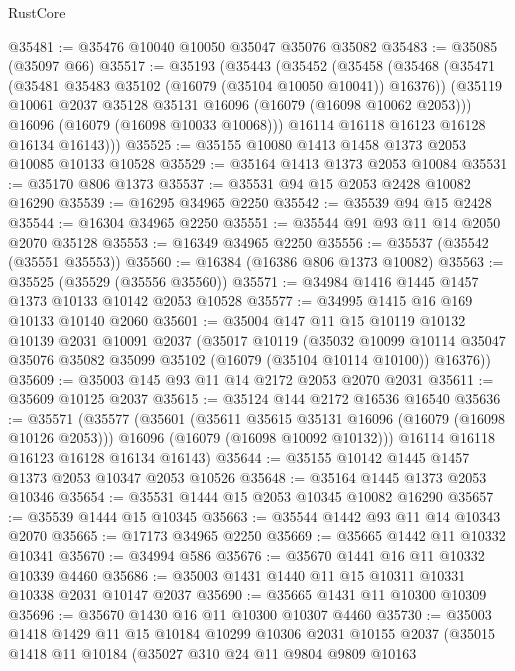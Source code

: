 \begin{lexlean}{RustCore}
\begin{coremodule}
@35481 := @35476 @10040 @10050 @35047 @35076 @35082
@35483 := @35085 (@35097 @66)
@35517 := @35193
    (@35443
      (@35452
        (@35458
          (@35468
            (@35471 (@35481 @35483 @35102 (@16079 (@35104 @10050 @10041)) @16376))
            (@35119 @10061 @2037 @35128 @35131 @16096 (@16079 (@16098 @10062 @2053)))
            @16096
            (@16079 (@16098 @10033 @10068)))
          @16114
          @16118
          @16123
          @16128
          @16134
          @16143)))
@35525 := @35155 @10080 @1413 @1458 @1373 @2053 @10085 @10133 @10528
@35529 := @35164 @1413 @1373 @2053 @10084
@35531 := @35170 @806 @1373
@35537 := @35531 @94 @15 @2053 @2428 @10082 @16290
@35539 := @16295 @34965 @2250
@35542 := @35539 @94 @15 @2428
@35544 := @16304 @34965 @2250
@35551 := @35544 @91 @93 @11 @14 @2050 @2070 @35128
@35553 := @16349 @34965 @2250
@35556 := @35537 (@35542 (@35551 @35553))
@35560 := @16384 (@16386 @806 @1373 @10082)
@35563 := @35525 (@35529 (@35556 @35560))
@35571 := @34984 @1416 @1445 @1457 @1373 @10133 @10142 @2053 @10528
@35577 := @34995 @1415 @16 @169 @10133 @10140 @2060
@35601 := @35004
    @147
    @11
    @15
    @10119
    @10132
    @10139
    @2031
    @10091
    @2037
    (@35017
      @10119
      (@35032
        @10099
        @10114
        @35047
        @35076
        @35082
        @35099
        @35102
        (@16079 (@35104 @10114 @10100))
        @16376))
@35609 := @35003 @145 @93 @11 @14 @2172 @2053 @2070 @2031
@35611 := @35609 @10125 @2037
@35615 := @35124 @144 @2172 @16536 @16540
@35636 := @35571
    (@35577
      (@35601
        (@35611 @35615 @35131 @16096 (@16079 (@16098 @10126 @2053)))
        @16096
        (@16079 (@16098 @10092 @10132)))
      @16114
      @16118
      @16123
      @16128
      @16134
      @16143)
@35644 := @35155 @10142 @1445 @1457 @1373 @2053 @10347 @2053 @10526
@35648 := @35164 @1445 @1373 @2053 @10346
@35654 := @35531 @1444 @15 @2053 @10345 @10082 @16290
@35657 := @35539 @1444 @15 @10345
@35663 := @35544 @1442 @93 @11 @14 @10343 @2070
@35665 := @17173 @34965 @2250
@35669 := @35665 @1442 @11 @10332 @10341
@35670 := @34994 @586
@35676 := @35670 @1441 @16 @11 @10332 @10339 @4460
@35686 := @35003 @1431 @1440 @11 @15 @10311 @10331 @10338 @2031 @10147 @2037
@35690 := @35665 @1431 @11 @10300 @10309
@35696 := @35670 @1430 @16 @11 @10300 @10307 @4460
@35730 := @35003
    @1418
    @1429
    @11
    @15
    @10184
    @10299
    @10306
    @2031
    @10155
    @2037
    (@35015
      @1418
      @11
      @10184
      (@35027
        @310
        @24
        @11
        @9804
        @9809
        @10163

\end{coremodule}
\end{lexlean}
